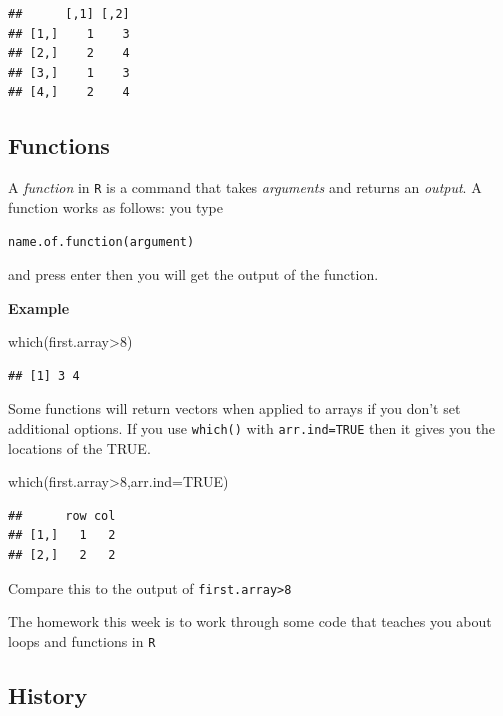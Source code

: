 \documentclass[
]{gitbook}
\newenvironment{Shaded}{\begin{snugshade}}{\end{snugshade}}
\newcommand{\AttributeTok}[1]{\textcolor[rgb]{0.77,0.63,0.00}{#1}}
\newcommand{\ConstantTok}[1]{\textcolor[rgb]{0.00,0.00,0.00}{#1}}
\newcommand{\DecValTok}[1]{\textcolor[rgb]{0.00,0.00,0.81}{#1}}
\newcommand{\FunctionTok}[1]{\textcolor[rgb]{0.00,0.00,0.00}{#1}}
\newcommand{\NormalTok}[1]{#1}
\newcommand{\SpecialCharTok}[1]{\textcolor[rgb]{0.00,0.00,0.00}{#1}}
\begin{document}
\begin{verbatim}
##      [,1] [,2]
## [1,]    1    3
## [2,]    2    4
## [3,]    1    3
## [4,]    2    4
\end{verbatim}

\hypertarget{functions}{%
\subsection{Functions}\label{functions}}

A \emph{function} in \texttt{R} is a command that takes \emph{arguments} and returns an \emph{output}. A function works as follows: you type

\texttt{name.of.function(argument)}

and press enter then you will get the output of the function.

\textbf{Example}

\begin{Shaded}
\begin{Highlighting}[]
\FunctionTok{which}\NormalTok{(first.array}\SpecialCharTok{\textgreater{}}\DecValTok{8}\NormalTok{)}
\end{Highlighting}
\end{Shaded}

\begin{verbatim}
## [1] 3 4
\end{verbatim}

Some functions will return vectors when applied to arrays if you don't set additional options. If you use \texttt{which()} with \texttt{arr.ind=TRUE} then it gives you the locations of the TRUE.

\begin{Shaded}
\begin{Highlighting}[]
\FunctionTok{which}\NormalTok{(first.array}\SpecialCharTok{\textgreater{}}\DecValTok{8}\NormalTok{,}\AttributeTok{arr.ind=}\ConstantTok{TRUE}\NormalTok{)}
\end{Highlighting}
\end{Shaded}

\begin{verbatim}
##      row col
## [1,]   1   2
## [2,]   2   2
\end{verbatim}

Compare this to the output of \texttt{first.array\textgreater{}8}

The homework this week is to work through some code that teaches you about loops and functions in \texttt{R}

\hypertarget{history}{%
\subsection{History}\label{history}}
\end{document}
